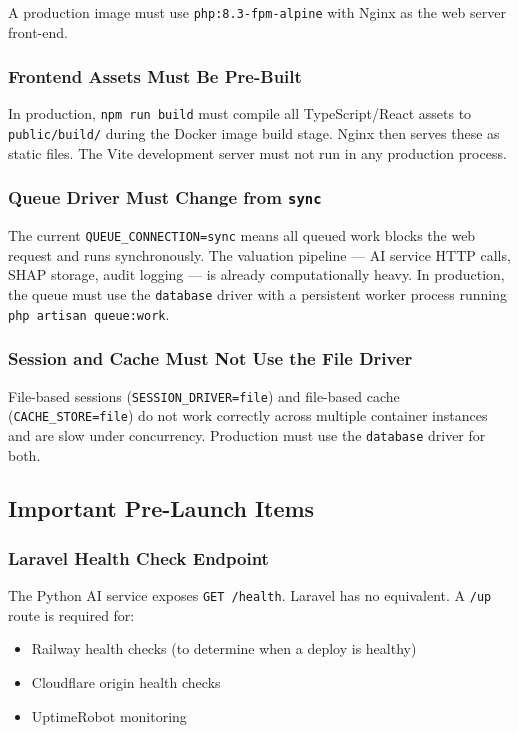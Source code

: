 \documentclass[12pt,a4paper]{report}
\begin{document}
A production image must use \texttt{php:8.3-fpm-alpine} with
Nginx as the web server front-end.

\subsubsection{Frontend Assets Must Be Pre-Built}

In production, \texttt{npm run build} must compile all TypeScript/React
assets to \texttt{public/build/} during the Docker image build stage.
Nginx then serves these as static files. The Vite development server
must not run in any production process.

\subsubsection{Queue Driver Must Change from \texttt{sync}}

The current \texttt{QUEUE\_CONNECTION=sync} means all queued work
blocks the web request and runs synchronously. The valuation pipeline
— AI service HTTP calls, SHAP storage, audit logging — is already
computationally heavy. In production, the queue must use the
\texttt{database} driver with a persistent worker process running
\texttt{php artisan queue:work}.

\subsubsection{Session and Cache Must Not Use the File Driver}

File-based sessions (\texttt{SESSION\_DRIVER=file}) and file-based
cache (\texttt{CACHE\_STORE=file}) do not work correctly across
multiple container instances and are slow under concurrency. Production
must use the \texttt{database} driver for both.

\subsection{Important Pre-Launch Items}

\subsubsection{Laravel Health Check Endpoint}

The Python AI service exposes \texttt{GET /health}. Laravel has no
equivalent. A \texttt{/up} route is required for:

\begin{itemize}[leftmargin=1.5em]
    \item Railway health checks (to determine when a deploy is healthy)
    \item Cloudflare origin health checks
    \item UptimeRobot monitoring
\end{itemize}
\end{document}
